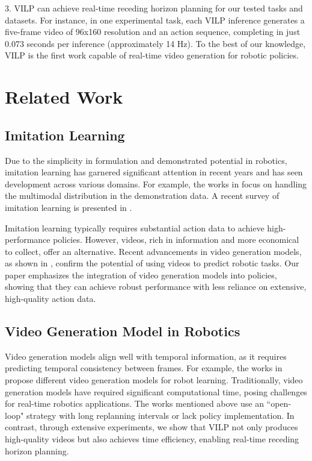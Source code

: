 \documentclass[doublecolumn]{IEEEtran}
\begin{document}
3. {VILP can achieve real-time receding horizon planning for our tested tasks and datasets. For instance, in one experimental task, each VILP inference generates a five-frame video of 96x160 resolution and an action sequence, completing in just 0.073 seconds per inference (approximately 14 Hz). {To the best of our knowledge, VILP is the first work capable of real-time video generation for robotic policies.}}




\section{Related Work}\label{sec:related_work}
\subsection{Imitation Learning}
Due to the simplicity in formulation and demonstrated potential in robotics, imitation learning has garnered significant attention in recent years and has seen development across various domains. For example, the works in \cite{florence2022implicit,chi2023diffusionpolicy,lee2024behavior} focus on handling the multimodal distribution in the demonstration data. A recent survey of imitation learning is presented in \cite{urain2024deep}.


Imitation learning typically requires substantial action data to achieve high-performance policies. However, videos, rich in information and more economical to collect, offer an alternative. Recent advancements in video generation models, as shown in \cite{brooks2024video}, confirm the potential of using videos to predict robotic tasks. Our paper emphasizes the integration of video generation models into policies, showing that they can achieve robust performance with less reliance on extensive, high-quality action data.

\subsection{Video Generation Model in Robotics}
Video generation models align well with temporal information, as it requires predicting temporal consistency between frames. For example, the works in \cite{du2023video,du2024learning,Ko2023Learning,yang2023learning,gu2023seer,liang2024dreamitate} propose different video generation models for robot learning. Traditionally, video generation models have required significant computational time, posing challenges for real-time robotics applications. The works mentioned above use an  ``open-loop" strategy with long replanning intervals or lack policy implementation. In contrast, through extensive experiments, we show that VILP not only produces high-quality videos but also achieves time efficiency, enabling real-time receding horizon planning.
\end{document}
